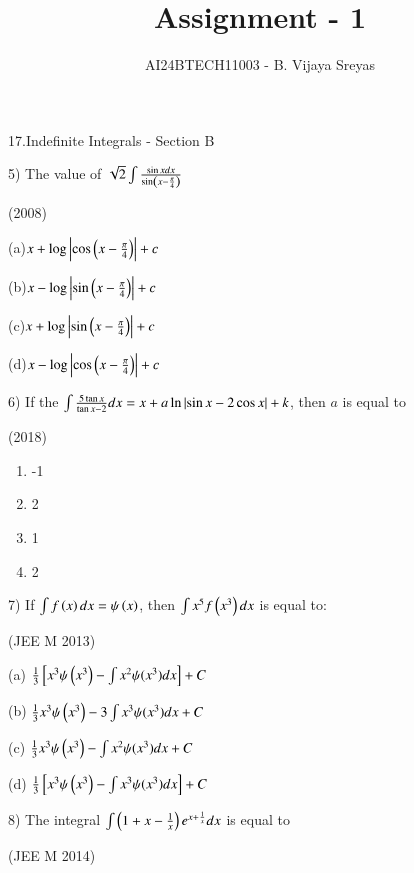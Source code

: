 \documentclass[journal,12pt,twocolumn]{IEEEtran}
\theoremstyle{remark}
\begin{document}

\vspace{3cm}

\title{Assignment - 1}
\author{AI24BTECH11003 - B. Vijaya Sreyas}
\maketitle
\newpage
\bigskip

\renewcommand{\thefigure}{\theenumi}
\renewcommand{\thetable}{\theenumi}

17.Indefinite Integrals - Section B

5)
	 The value of $\sqrt{2}\int\frac{\sin xdx}{\sin \left(x-\frac{\pi}{4}\right)}$

		\hfill{(2008)}

		(a)$x+\log\left\vert\cos \left(x-\frac{\pi}{4}\right)\right\vert+c$

		(b)$x-\log\left\vert\sin \left(x-\frac{\pi}{4}\right)\right\vert+c$

		(c)$x+\log\left\vert\sin \left(x-\frac{\pi}{4}\right)\right\vert+c$

		(d)$x-\log\left\vert\cos \left(x-\frac{\pi}{4}\right)\right\vert+c$

6)
	 If the $\int\frac{5\tan x}{\tan x-2}dx=x+a\ln \left\vert\sin x-2\cos x\right\vert+k$, then $a$ is equal to

		\hfill{(2018)}

		\begin{multicols}{4}
			\begin{enumerate}
				\item -1
				\item 2
				\item 1
				\item 2
			\end{enumerate}
		\end{multicols}
		
7)
	If $\int f\left(x\right)dx=\psi\left(x\right)$, then $\int x^5f\left(x^3\right)dx$ is equal to:

		\hfill{(JEE M 2013)}

		(a) $\frac{1}{3}{}\left[x^3\psi\left(x^3\right)-\int x^2\psi(x^3)dx\right] + C$

		(b) $\frac{1}{3}x^3\psi\left(x^3\right)-3\int x^3\psi(x^3)dx + C$

		(c) $\frac{1}{3}x^3\psi\left(x^3\right)-\int x^2\psi(x^3)dx + C$

		(d) $\frac{1}{3}{}\left[x^3\psi\left(x^3\right)-\int x^3\psi(x^3)dx\right] + C$

8)
	 The integral $\int\left(1+x-\frac{1}{x}\right)e^{x+\frac{1}{x}}dx$ is equal to

		\hfill{(JEE M 2014)}
\end{document}
